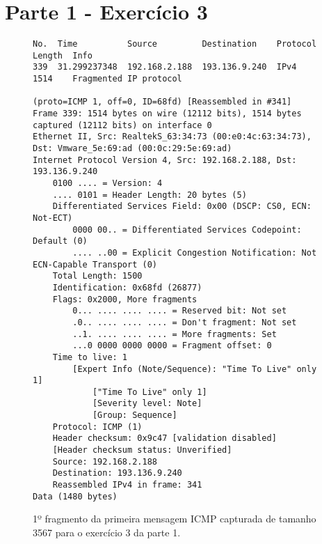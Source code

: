 \section*{Parte 1 - Exercício 3}

\begin{figure}[p]
  \centering
\begin{Verbatim}[fontsize=\scriptsize]
No.  Time          Source         Destination    Protocol  Length  Info
339  31.299237348  192.168.2.188  193.136.9.240  IPv4      1514    Fragmented IP protocol

(proto=ICMP 1, off=0, ID=68fd) [Reassembled in #341]
Frame 339: 1514 bytes on wire (12112 bits), 1514 bytes captured (12112 bits) on interface 0
Ethernet II, Src: RealtekS_63:34:73 (00:e0:4c:63:34:73), Dst: Vmware_5e:69:ad (00:0c:29:5e:69:ad)
Internet Protocol Version 4, Src: 192.168.2.188, Dst: 193.136.9.240
    0100 .... = Version: 4
    .... 0101 = Header Length: 20 bytes (5)
    Differentiated Services Field: 0x00 (DSCP: CS0, ECN: Not-ECT)
        0000 00.. = Differentiated Services Codepoint: Default (0)
        .... ..00 = Explicit Congestion Notification: Not ECN-Capable Transport (0)
    Total Length: 1500
    Identification: 0x68fd (26877)
    Flags: 0x2000, More fragments
        0... .... .... .... = Reserved bit: Not set
        .0.. .... .... .... = Don't fragment: Not set
        ..1. .... .... .... = More fragments: Set
        ...0 0000 0000 0000 = Fragment offset: 0
    Time to live: 1
        [Expert Info (Note/Sequence): "Time To Live" only 1]
            ["Time To Live" only 1]
            [Severity level: Note]
            [Group: Sequence]
    Protocol: ICMP (1)
    Header checksum: 0x9c47 [validation disabled]
    [Header checksum status: Unverified]
    Source: 192.168.2.188
    Destination: 193.136.9.240
    Reassembled IPv4 in frame: 341
Data (1480 bytes)
\end{Verbatim}
  \caption{1º fragmento da primeira mensagem ICMP capturada de tamanho 3567 para
  o exercício 3 da parte 1.}
  \label{fig:parte1-ex3-pacote-frag1}
\end{figure}

